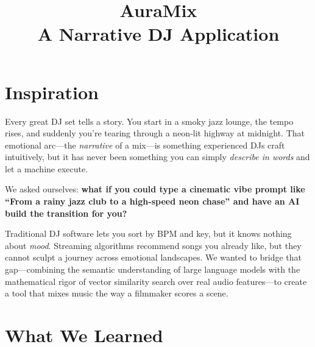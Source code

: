 \documentclass[11pt,a4paper]{article}
\title{\textbf{AuraMix} \\ \large A Narrative DJ Application}
\author{}
\date{}
\begin{document}
\maketitle

\section{Inspiration}

Every great DJ set tells a story.
You start in a smoky jazz lounge, the tempo rises, and suddenly you're tearing through a neon-lit highway at midnight.
That emotional arc---the \emph{narrative} of a mix---is something experienced DJs craft intuitively, but it has never been something you can simply \emph{describe in words} and let a machine execute.

We asked ourselves: \textbf{what if you could type a cinematic vibe prompt like ``From a rainy jazz club to a high-speed neon chase'' and have an AI build the transition for you?}

Traditional DJ software lets you sort by BPM and key, but it knows nothing about \emph{mood}.
Streaming algorithms recommend songs you already like, but they cannot sculpt a journey across emotional landscapes.
We wanted to bridge that gap---combining the semantic understanding of large language models with the mathematical rigor of vector similarity search over real audio features---to create a tool that mixes music the way a filmmaker scores a scene.

\section{What We Learned}
\end{document}

